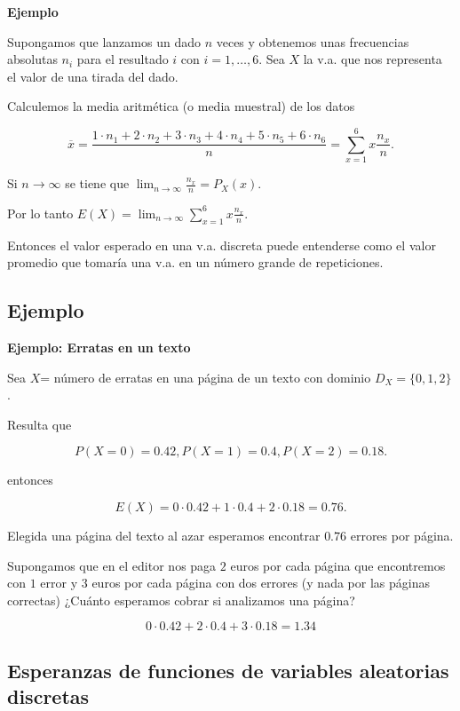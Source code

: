 \documentclass[]{book}
\begin{document}
\textbf{Ejemplo}

Supongamos que lanzamos un dado \(n\) veces y obtenemos unas frecuencias absolutas \(n_{i}\)
para el resultado \(i\) con \(i=1,\ldots,6\). Sea \(X\) la v.a. que nos representa el valor de
una tirada del dado.

Calculemos la media aritmética (o media muestral) de los datos

\[
\overline{x}=\frac{1\cdot n_1+2\cdot  n_2+3\cdot  n_3+4\cdot  n_4+5\cdot  n_5+6 \cdot 
n_6}{n}=\sum_{x=1}^6 x \frac{n_{x}}{n}.
\]

Si \(n\to \infty\) se tiene que \(\displaystyle\lim_{n\to \infty} \frac{n_{x}}{n}=P_{X}(x).\)

Por lo tanto \(E(X)=\displaystyle \lim_{n\to\infty}\sum_{x=1}^6x \frac{n_{x}}{n}.\)

Entonces el valor esperado en una v.a. discreta puede entenderse como el valor promedio que
tomaría una v.a. en un número grande de repeticiones.

\hypertarget{ejemplo-13}{%
\subsection{Ejemplo}\label{ejemplo-13}}

\textbf{Ejemplo: Erratas en un texto}

Sea \(X\)= número de erratas en una página de un texto con dominio \(D_X=\{0,1,2\}\).

Resulta que

\[
P(X=0)=0.42, P(X=1)=0.4, P(X=2)=0.18.
\]

entonces

\[
E(X)=0\cdot 0.42+ 1\cdot 0.4 + 2 \cdot 0.18=0.76.
\]

Elegida una página del texto al azar esperamos encontrar \(0.76\) errores por página.

Supongamos que en el editor nos paga \(2\) euros por cada página que
encontremos con \(1\) error y \(3\) euros por cada página con dos errores (y nada por las
páginas correctas) ¿Cuánto esperamos cobrar si analizamos una página?

\[0\cdot 0.42 + 2\cdot 0.4 + 3\cdot 0.18=1.34\]

\hypertarget{esperanzas-de-funciones-de-variables-aleatorias-discretas}{%
\subsection{Esperanzas de funciones de variables aleatorias discretas}\label{esperanzas-de-funciones-de-variables-aleatorias-discretas}}
\end{document}
